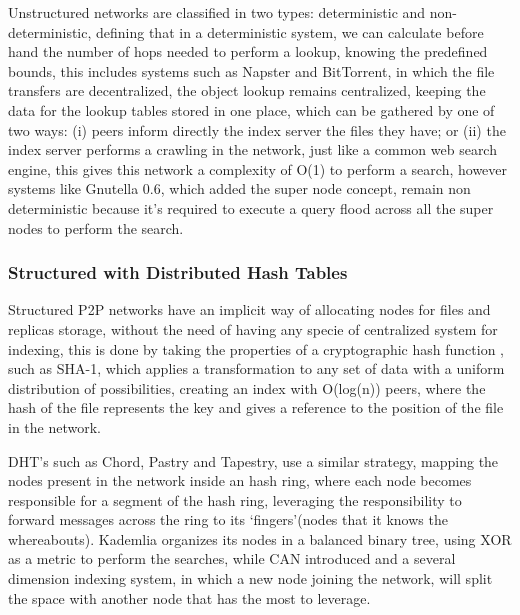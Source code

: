 Unstructured networks are classified\cite{Ranjan2006} in two types: deterministic and non-deterministic, defining that in a deterministic system, we can calculate before hand the number of hops needed to perform a lookup, knowing the predefined bounds, this includes systems such as Napster and BitTorrent\cite{Cohen2009}, in which the file transfers are decentralized, the object lookup remains centralized, keeping the data for the lookup tables stored in one place, which can be gathered by one of two ways: (i) peers inform directly the index server the files they have; or (ii) the index server performs a crawling in the network, just like a common web search engine, this gives this network a complexity of O(1) to perform a search, however systems like Gnutella 0.6, which added the super node concept, remain non deterministic because it's required to execute a query flood across all the super nodes to perform the search.

\subsubsection{Structured with Distributed Hash Tables}\label{par:Structured with Distributed Hash Tables}

Structured P2P networks have an implicit way of allocating nodes for files and replicas storage, without the need of having any specie of centralized system for indexing, this is done by taking the properties of a cryptographic hash function \cite{Bakhtiari}\cite{Kargerl}\cite{Preneel1999}, such as SHA-1\cite{D.Eastlake3rdMotorola;P.JonesSystems2001}, which applies a transformation to any set of data with a uniform distribution of possibilities, creating an index with O(log(n)) peers, where the hash of the file represents the key and gives a reference to the position of the file in the network.

DHT's such as Chord\cite{Stoica2001}, Pastry\cite{Rowstron2001} and Tapestry\cite{Zhao2001}, use a similar strategy, mapping the nodes present in the network inside an hash ring, where each node becomes responsible for a segment of the hash ring, leveraging the responsibility to forward messages across the ring to its `fingers'(nodes that it knows the whereabouts). Kademlia\cite{Maymounkov} organizes its nodes in a balanced binary tree, using XOR as a metric to perform the searches, while CAN\cite{Handley} introduced and a several dimension indexing system, in which a new node joining the network, will split the space with another node that has the most to leverage.

